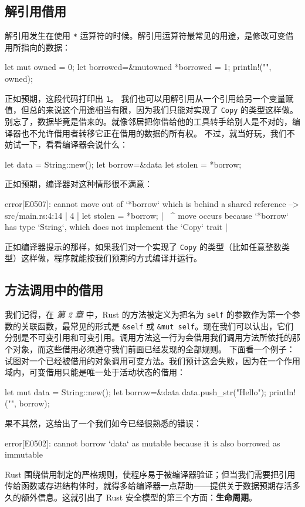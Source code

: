 \subsection{解引用借用}
\label{idx:idx_629c43f7}
解引用发生在使用 \texttt{*} 运算符的时候。解引用运算符最常见的用途，是修改可变借用所指向的数据：
\begin{codebox}[rust]
let mut owned = 0;
let borrowed=&mutowned
*borrowed = 1;
println!("{}", owned);
\end{codebox}
正如预期，这段代码打印出 \texttt{1}。
我们也可以用解引用从一个引用给另一个变量赋值，但总的来说这个用途相当有限，因为我们只能对实现了 \texttt{Copy} 的类型这样做。别忘了，数据毕竟是借来的。就像邻居把你借给他的工具转手给别人是不对的，编译器也不允许借用者转移它正在借用的数据的所有权。
不过，就当好玩，我们不妨试一下，看看编译器会说什么：
\begin{codebox}[rust]
let data = String::new();
let borrow=&data
let stolen = *borrow;
\end{codebox}
正如预期，编译器对这种情形很不满意：
\begin{codebox}[rust]
error[E0507]: cannot move out of `*borrow` which is behind a shared reference
 --> src/main.rs:4:14
  |
4 | let stolen = *borrow;
  |              ^^^^^^^ move occurs because `*borrow` has type `String`, which
does not implement the `Copy` trait
  |
\end{codebox}
\label{idx:idx_3636e30b}
正如编译器提示的那样，如果我们对一个实现了 \texttt{Copy} 的类型（比如任意整数类型）这样做，程序就能按我们预期的方式编译并运行。
\subsection{方法调用中的借用}
\label{idx:idx_cabb852c}
我们记得，在 \emph{第 2 章} 中，Rust 的方法被定义为把名为 \texttt{self} 的参数作为第一个参数的关联函数，最常见的形式是 \texttt{\&self} 或 \texttt{\&mut self}。现在我们可以认出，它们分别是不可变引用和可变引用。调用方法这一行为会借用我们调用方法所依托的那个对象，而这些借用必须遵守我们前面已经发现的全部规则。
下面看一个例子：试图对一个已经被借用的对象调用可变方法。我们预计这会失败，因为在一个作用域内，可变借用只能是唯一处于活动状态的借用：
\begin{codebox}[rust]
let mut data = String::new();
let borrow=&data
data.push_str("Hello");
println!("{}", borrow);
\end{codebox}
果不其然，这给出了一个我们如今已经很熟悉的错误：
\begin{codeboxdark}
error[E0502]: cannot borrow `data` as mutable because it is also borrowed as
immutable
\end{codeboxdark}
\label{idx:idx_f3c42eba}
Rust 围绕借用制定的严格规则，使程序易于被编译器验证；但当我们需要把引用传给函数或存进结构体时，就得多给编译器一点帮助——提供关于数据预期存活多久的额外信息。这就引出了 Rust 安全模型的第三个方面：\textbf{生命周期}。
